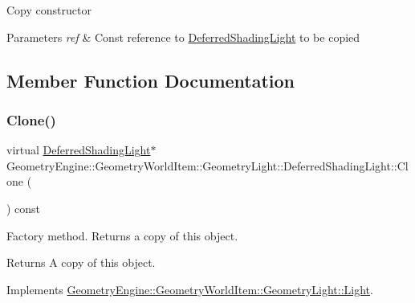 Copy constructor 
\begin{DoxyParams}{Parameters}
{\em ref} & Const reference to \mbox{\hyperlink{class_geometry_engine_1_1_geometry_world_item_1_1_geometry_light_1_1_deferred_shading_light}{Deferred\+Shading\+Light}} to be copied \\
\hline
\end{DoxyParams}


\subsection{Member Function Documentation}
\mbox{\label{class_geometry_engine_1_1_geometry_world_item_1_1_geometry_light_1_1_deferred_shading_light_a7ef4d7b7a41cbda01a55bcb0475484d3}} 
\subsubsection{\texorpdfstring{Clone()}{Clone()}}
{\footnotesize\ttfamily virtual \mbox{\hyperlink{class_geometry_engine_1_1_geometry_world_item_1_1_geometry_light_1_1_deferred_shading_light}{Deferred\+Shading\+Light}}$\ast$ Geometry\+Engine\+::\+Geometry\+World\+Item\+::\+Geometry\+Light\+::\+Deferred\+Shading\+Light\+::\+Clone (\begin{DoxyParamCaption}{ }\end{DoxyParamCaption}) const\hspace{0.3cm}{\ttfamily [pure virtual]}}

Factory method. Returns a copy of this object. \begin{DoxyReturn}{Returns}
A copy of this object. 
\end{DoxyReturn}


Implements \mbox{\hyperlink{class_geometry_engine_1_1_geometry_world_item_1_1_geometry_light_1_1_light_af367fa7201ad377a45fdc13e2002c518}{Geometry\+Engine\+::\+Geometry\+World\+Item\+::\+Geometry\+Light\+::\+Light}}.



